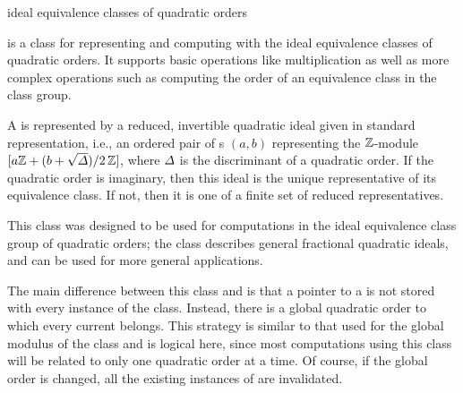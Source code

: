 

\NAME

 \dotfill ideal equivalence classes of quadratic orders



\ABSTRACT

 is a class for representing and computing with the ideal equivalence classes of
quadratic orders.  It supports basic operations like multiplication as well as more complex
operations such as computing the order of an equivalence class in the class group.



\DESCRIPTION

A  is represented by a reduced, invertible quadratic ideal given in standard
representation, i.e., an ordered pair of s $(a,b)$ representing the $\mathbb{Z}$-module
$[a\mathbb{Z} + (b + \sqrt{\varDelta}) / 2\,\mathbb{Z} ]$, where $\varDelta$ is the discriminant of a quadratic order.
If the quadratic order is imaginary, then this ideal is the unique representative of its
equivalence class.  If not, then it is one of a finite set of reduced representatives.

This class was designed to be used for computations in the ideal equivalence class group of
quadratic orders; the class  describes general fractional quadratic
ideals, and can be used for more general applications.

The main difference between this class and  is that a pointer to a
 is not stored with every instance of the class.  Instead, there is a
global quadratic order to which every current  belongs.  This strategy is similar
to that used for the global modulus of the  class and is logical here, since most
computations using this class will be related to only one quadratic order at a time.  Of course,
if the global order is changed, all the existing instances of  are invalidated.


